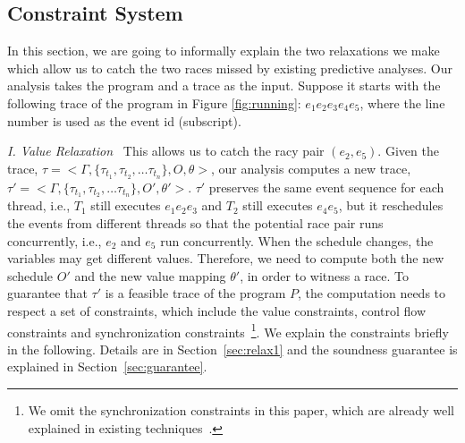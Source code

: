 


\subsection{Constraint System}
In this section, we are going to informally explain the two relaxations
we make which allow us to catch the two races missed by existing 
predictive analyses.
Our analysis takes the program and a trace as the input.  
Suppose it starts with the following trace of the program in  
Figure \ref{fig:running}:  $e_1 e_2 e_3 e_4 e_5$, where the line number 
is used as the event id (subscript). 

\smallskip
\noindent
{\em I. Value Relaxation\ }
This allows us to catch the racy pair $(e_2, e_5)$.
Given the trace, $\tau=<\Gamma , \{\tau_{t_1}, \tau_{t_2}, \dots \tau_{t_n} \},
 O, \theta>$, our analysis computes a new trace,  
$\tau'=<\Gamma , \{\tau_{t_1}, \tau_{t_2}, \dots \tau_{t_n} \}, O', \theta'>$.
 $\tau'$ preserves the same event sequence for each thread, i.e., $T_1$ still 
executes $e_1 e_2 e_3$ and $T_2$ still executes $e_4 e_5$, but it reschedules 
the events from different threads so that the potential race pair runs 
concurrently, i.e., $e_2$ and $e_5$ run concurrently. When the schedule 
changes, the variables may get different values. Therefore, we need to 
compute both the new schedule $O'$ and the new value mapping $\theta'$, in 
order to witness a race. To guarantee that $\tau'$ is a feasible trace of 
the program $P$, the computation needs to respect a set of constraints, 
which include the value constraints, control flow constraints and 
synchronization constraints~\footnote{We omit the synchronization constraints 
in this paper, which are already well explained in existing 
techniques~\cite{yannis, pecan}.}. We explain the constraints 
briefly in the following. Details are in Section~\ref{sec:relax1} 
and the soundness guarantee is explained in Section~\ref{sec:guarantee}.




